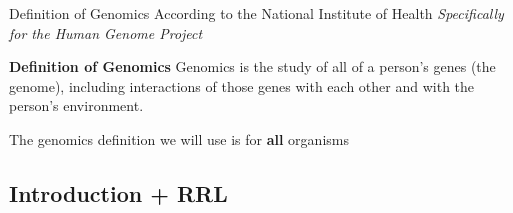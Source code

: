 \documentclass{beamer}
\begin{document}
    
    \begin{frame}{Definition of Genomics}
        According to the National Institute of Health \textit{Specifically for the Human Genome Project}
                \begin{block} {\textbf{Definition of Genomics}}
        Genomics is the study of all of a person's genes (the genome), including interactions of those genes with each other and with the person's environment. \cite{genomics-definition}
                \end{block}
    The genomics definition we will use is for \textbf{all} organisms
    \end{frame}
    
    
    \subsection{Introduction + RRL}
\end{document}
